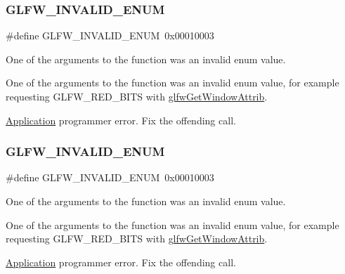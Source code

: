 \subsubsection{\texorpdfstring{G\+L\+F\+W\+\_\+\+I\+N\+V\+A\+L\+I\+D\+\_\+\+E\+N\+UM}{GLFW\_INVALID\_ENUM}\hspace{0.1cm}{\footnotesize\ttfamily [1/5]}}
{\footnotesize\ttfamily \#define G\+L\+F\+W\+\_\+\+I\+N\+V\+A\+L\+I\+D\+\_\+\+E\+N\+UM~0x00010003}



One of the arguments to the function was an invalid enum value. 

One of the arguments to the function was an invalid enum value, for example requesting G\+L\+F\+W\+\_\+\+R\+E\+D\+\_\+\+B\+I\+TS with \hyperlink{group__window_ga1bb0c7e100418e284dbb800789c63d40}{glfw\+Get\+Window\+Attrib}.

\hyperlink{classApplication}{Application} programmer error. Fix the offending call. \mbox{\label{group__errors_ga76f6bb9c4eea73db675f096b404593ce}} 
\subsubsection{\texorpdfstring{G\+L\+F\+W\+\_\+\+I\+N\+V\+A\+L\+I\+D\+\_\+\+E\+N\+UM}{GLFW\_INVALID\_ENUM}\hspace{0.1cm}{\footnotesize\ttfamily [2/5]}}
{\footnotesize\ttfamily \#define G\+L\+F\+W\+\_\+\+I\+N\+V\+A\+L\+I\+D\+\_\+\+E\+N\+UM~0x00010003}



One of the arguments to the function was an invalid enum value. 

One of the arguments to the function was an invalid enum value, for example requesting G\+L\+F\+W\+\_\+\+R\+E\+D\+\_\+\+B\+I\+TS with \hyperlink{group__window_ga1bb0c7e100418e284dbb800789c63d40}{glfw\+Get\+Window\+Attrib}.

\hyperlink{classApplication}{Application} programmer error. Fix the offending call. \mbox{\label{group__errors_ga76f6bb9c4eea73db675f096b404593ce}} 
